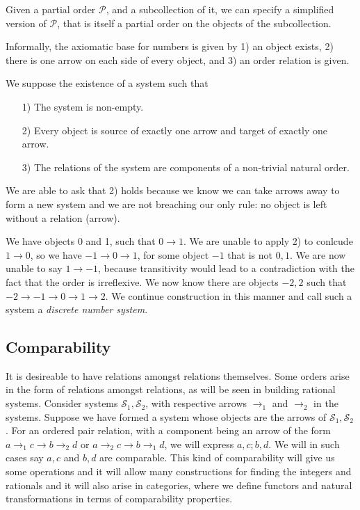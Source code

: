 \documentclass [12pt]{book}
\begin{document}
\begin{proposition}Given a partial order $\mathcal P$, and a subcollection of it, we can specify a simplified version of $\mathcal P$, that is itself a partial order on the objects of the subcollection.\end{proposition}

Informally, the  axiomatic base for numbers is given by 1) an object exists, 2) there is one arrow on each side of every object, and 3) an order relation is given.
\begin{axiom}We suppose the existence of a system such that 

\begin{itemize}\item[1)] The system is non-empty.\item[2)] Every object is source of exactly one arrow and target of exactly one arrow.\item[3)] The relations of the system are components of a non-trivial natural order.\end{itemize}\end{axiom}

We are able to ask that 2) holds because we know we can take arrows away to form a new system and we are not breaching our only rule: no object is left without a relation (arrow).

We have objects 0 and 1, such that $0\rightarrow1$. We are unable to apply 2) to conlcude $1\rightarrow0$, so we have $-1\rightarrow0\rightarrow1$, for some object $-1$ that is not $0,1$. We are now unable to say $1\rightarrow-1$, because transitivity would lead to a contradiction with the fact that the order is irreflexive. We now know there are objects $-2,2$ such that $-2\rightarrow-1\rightarrow0\rightarrow1\rightarrow2$. We continue construction in this manner and call such a system a \textit{discrete number system}.

		\subsection{Comparability}

It is desireable to have relations amongst relations themselves. Some orders arise in the form of relations amongst relations, as will be seen in building rational systems. Consider systems $\mathcal{S}_{1},\mathcal{S}_{2}$, with respective arrows $\rightarrow_{1}$ and $\rightarrow_{2}$ in the systems. Suppose we have formed a system whose objects are the arrows of $\mathcal{S}_{1},\mathcal{S}_{2}$. For an ordered pair relation, with a component being an arrow of the form $a\rightarrow_{1}c\longrightarrow b\rightarrow_{2}d$ or $a\rightarrow_{2}c\longrightarrow b\rightarrow_{1}d$, we will express $a,c;b,d$. We will in such cases say $a,c$ and $b,d$ are comparable. This kind of comparability will give us some operations and it will allow many constructions for finding the integers and rationals and it will also arise in categories, where we define functors and natural transformations in terms of comparability properties.
\end{document}
